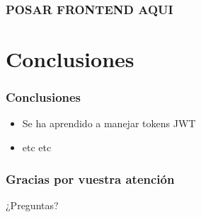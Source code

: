 \documentclass{beamer}
\begin{document}
		\begin{frame}
			\frametitle{POSAR FRONTEND AQUI}
			
			
		\end{frame}
	
	
	
	
	
	
	
	
	
	
	
	
	
	
	
	
	
	
	
	
	
	
	
	
	
	
	
	\section{Conclusiones}
	
	\begin{frame}
		\frametitle{Conclusiones}
		\begin{itemize}
			\item Se ha aprendido a manejar tokens JWT
			\item etc etc
		\end{itemize}
	\end{frame}
	
	\begin{frame}
		\frametitle{Gracias por vuestra atención}
		¿Preguntas?
	\end{frame}
	
	
	
	
	
	
	
	
	
\end{document}
